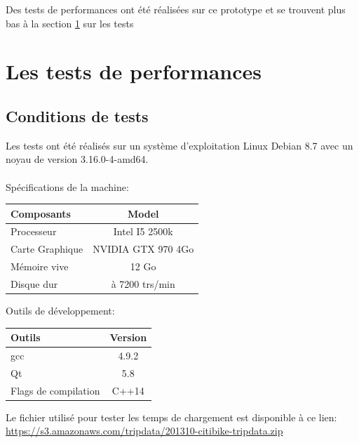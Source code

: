 \documentclass[12pt]{article}
\begin{document}
	Des tests de performances ont été réalisées sur ce prototype et se trouvent plus bas à la
	section \ref{tests_performances} sur les tests\.\\

	\section{Les tests de performances} \label{tests_performances}
		\subsection{Conditions de tests}
		Les tests ont été réalisés sur un système d’exploitation Linux Debian 8.7 avec
		un noyau de version 3.16.0-4-amd64. \\ \\
		Spécifications de la machine: \\
		
		\begin{center}
			\begin{tabular}{| l | c |}
			\hline
			\textbf{Composants} & \textbf{Model} \\ \hline
			Processeur & Intel I5 2500k \\ \hline
			Carte Graphique & NVIDIA GTX 970 4Go \\ \hline
			Mémoire vive & 12 Go \\ \hline
			Disque dur & à 7200 trs/min \\ \hline
		    \end{tabular}
	    \end{center}
	    
	    Outils de développement: \\
	    \begin{center}
			\begin{tabular}{| l | c |}
			\hline
			\textbf{Outils} & \textbf{Version} \\ \hline
			gcc & 4.9.2 \\ \hline
			Qt & 5.8 \\ \hline
			Flags de compilation & C++14\\ \hline
		    \end{tabular}
	    \end{center}
	    
	    Le fichier utilisé pour tester les temps de chargement est disponible à ce lien:\\
		\url{https://s3.amazonaws.com/tripdata/201310-citibike-tripdata.zip}\\
		
\end{document}
